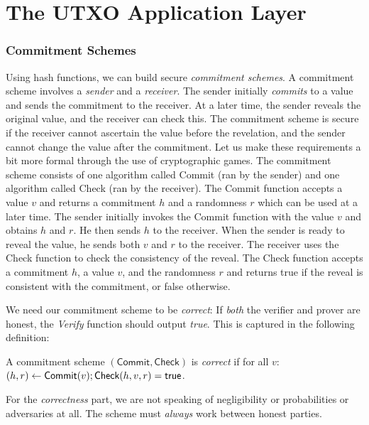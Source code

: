 \chapter{The UTXO Application Layer}

\subsection*{Commitment Schemes}

Using hash functions, we can build secure \emph{commitment schemes}.
A commitment scheme involves a \emph{sender} and a \emph{receiver}. The sender initially
\emph{commits} to a value and sends the commitment to the receiver. At a later time, the
sender reveals the original value, and the receiver can check this. The commitment scheme
is secure if the receiver cannot ascertain the value before the revelation, and the sender
cannot change the value after the commitment. Let us make these requirements a bit more
formal through the use of cryptographic games.
The commitment scheme consists of one algorithm called \textsf{Commit} (ran by the sender)
and one algorithm called \textsf{Check} (ran by the receiver).
The \textsf{Commit} function accepts a value $v$ and returns a commitment $h$ and a randomness
$r$ which can be used at a later time. The sender initially invokes the \textsf{Commit}
function with the value $v$ and obtains $h$ and $r$. He then sends $h$ to the receiver.
When the sender is ready to reveal the value, he sends both $v$ and $r$ to the receiver.
The receiver uses the \textsf{Check} function to check the consistency of the reveal.
The \textsf{Check} function accepts a commitment $h$, a value $v$,
and the randomness $r$ and returns \textsf{true} if the reveal is consistent with the
commitment, or \textsf{false} otherwise.

We need our commitment
scheme to be \emph{correct}: If \emph{both} the verifier and prover are honest, the \emph{Verify}
function should output \emph{true}. This is captured in the following definition:

\begin{definition}
  A commitment scheme $(\textsf{Commit}, \textsf{Check})$ is \emph{correct} if
  for all $v$:
  $(h, r) \gets \textsf{Commit}(v); \textsf{Check}(h, v, r) = \textsf{true}$.
\end{definition}

For the \emph{correctness} part, we are not speaking of negligibility or probabilities
or adversaries at all. The scheme must \emph{always} work between honest parties.

